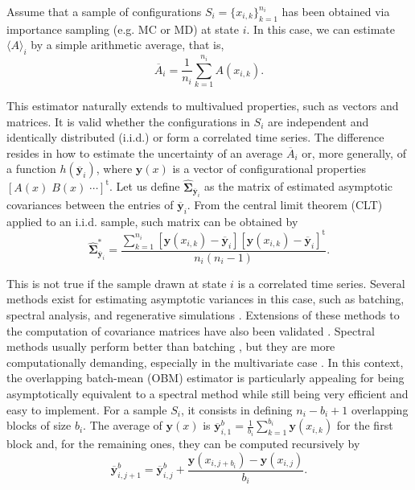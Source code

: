 \documentclass[journal=jctcce,manuscript=article,layout=twocolumn]{achemso}
\newcommand{\mt}[1]{\boldsymbol{\mathbf{#1}}}   %
\newcommand{\vt}[1]{\boldsymbol{\mathbf{#1}}}   %
\newcommand{\tr}[1]{#1^\text{t}}                %
\begin{document}
Assume that a sample of configurations $S_i = \{x_{i,k}\}_{k=1}^{n_i}$ has been obtained via importance sampling \cite{Allen_1987} (e.g. MC or MD) at state $i$. In this case, we can estimate $\langle A \rangle_i$ by a simple arithmetic average, that is,
\begin{equation}
\label{eq:average estimator}
\overline A_i = \frac{1}{n_i} \sum_{k=1}^{n_i} A(x_{i,k}).
\end{equation}

This estimator naturally extends to multivalued properties, such as vectors and matrices. It is valid whether the configurations in $S_i$ are independent and identically distributed (i.i.d.) or form a correlated time series. The difference resides in how to estimate the uncertainty of an average $\overline A_i$ or, more generally, of a function $h(\overline {\vt y}_i)$, where $\vt y(x)$ is a vector of configurational properties $\tr{[A(x) \; B(x) \; \cdots]}$. Let us define $\hat{\mt \Sigma}_{\overline{\vt y}_i}$ as the matrix of estimated asymptotic covariances between the entries of $\overline{\vt y}_i$. From the central limit theorem (CLT) applied to an i.i.d. sample, such matrix can be obtained by
\begin{equation*}
\label{eq:asymptotic covariance IID}
\hat{\mt \Sigma}^\ast_{\overline{\vt y}_i} = \frac{\sum\limits_{k=1}^{n_i} \left[\vt y(x_{i,k}) - \overline{\vt y}_i\right] \tr{\left[\vt y(x_{i,k}) - \overline{\vt y}_i\right]}}{n_i(n_i - 1)}.
\end{equation*}

This is not true if the sample drawn at state $i$ is a correlated time series. Several methods exist for estimating asymptotic variances in this case, such as batching, spectral analysis, and regenerative simulations \cite{Geyer_1992, Alexopoulos_2006, Flegal_2010, Doss_2014}. Extensions of these methods to the computation of covariance matrices have also been validated \cite{Vats_2015, Vats_2017}. Spectral methods usually perform better than batching \cite{Flegal_2010}, but they are more computationally demanding, especially in the multivariate case \cite{Vats_2015}. In this context, the overlapping batch-mean (OBM) estimator \cite{Meketon_1984} is particularly appealing for being asymptotically equivalent to a spectral method while still being very efficient and easy to implement. For a sample $S_i$, it consists in defining $n_i-b_i+1$ overlapping blocks of size $b_i$. The average of $\vt y(x)$ is ${\overline{\vt y}}^b_{i,1} = \frac{1}{b_i} \sum_{k=1}^{b_i} \vt y(x_{i,k})$ for the first block and, for the remaining ones, they can be computed recursively by
\begin{equation*}
{\overline{\vt y}}^b_{i,j+1} = {\overline{\vt y}}^b_{i,j} + \frac{\vt y(x_{i,j+b_i}) - \vt y(x_{i,j})}{b_i}.
\end{equation*}
\end{document}
